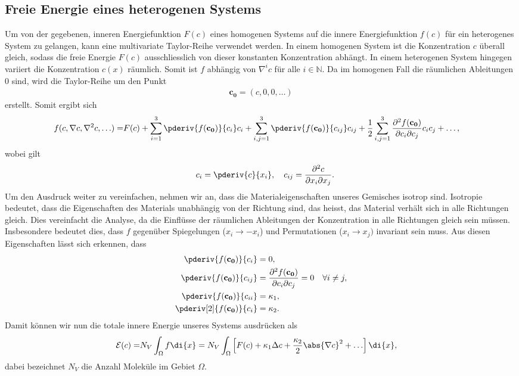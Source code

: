 \subsection{Freie Energie eines heterogenen Systems}
Um von der gegebenen, inneren Energiefunktion $F(c)$ eines homogenen Systems
auf die innere Energiefunktion $f(c)$ für ein heterogenes System zu gelangen,
kann eine multivariate Taylor-Reihe verwendet werden.
In einem homogenen System ist die Konzentration $c$ überall gleich,
sodass die freie Energie $F(c)$ ausschliesslich von dieser konstanten Konzentration abhängt.
In einem heterogenen System hingegen variiert die Konzentration $c(x)$ räumlich.
Somit ist $f$ abhängig von $\nabla^i c$ für alle $i \in \mathbb{N}$.
Da im homogenen Fall die räumlichen Ableitungen $0$ sind,
wird die Taylor-Reihe um den Punkt
\begin{align*}
\mathbf{c_0}
=
(c, 0, 0, \ldots)
\end{align*}
erstellt.
Somit ergibt sich
\begin{align*}
f(c, \nabla c, \nabla^2 c, \ldots)
=
& F(c)
+ \sum_{i=1}^3 \pderiv{f(\mathbf{c_0})}{c_i} c_i
+ \sum_{i,j=1}^3 \pderiv{f(\mathbf{c_0})}{c_{ij}} c_{ij}
+ \frac{1}{2} \sum_{i,j=1}^3 \frac{\partial^2 f(\mathbf{c_0})}{%
\partial c_i \partial c_j} c_{i} c_{j}
+ \ldots
,
\end{align*}
wobei gilt
\begin{align*}
\quad
c_i
=
\pderiv{c}{x_i}
,\quad
c_{ij}
=
\frac{\partial^2 c}{\partial x_i \partial x_j}
.
\end{align*}
Um den Ausdruck weiter zu vereinfachen,
nehmen wir an,
dass die Materialeigenschaften unseres Gemisches isotrop sind.
Isotropie bedeutet,
dass die Eigenschaften des Materials unabhängig von der Richtung sind,
das heisst,
das Material verhält sich in alle Richtungen gleich.
Dies vereinfacht die Analyse,
da die Einflüsse der räumlichen Ableitungen der Konzentration
in alle Richtungen gleich sein müssen.
Insbesondere bedeutet dies,
dass $f$ gegenüber Spiegelungen ($x_i \rightarrow -x_i$) und
Permutationen ($x_i \rightarrow x_j)$ invariant sein muss.
Aus diesen Eigenschaften lässt sich erkennen,
dass
\begin{align*}
\pderiv{f(\mathbf{c_0})}{c_i}
&=
0,
\\
\pderiv{f(\mathbf{c_0})}{c_{ij}}
&=
\frac{\partial^2 f(\mathbf{c_0})}{\partial c_i \partial c_j}
=
0
\quad \forall i \neq j,
\\
\pderiv{f(\mathbf{c_0})}{c_{ii}}
&=
\kappa_1,
\\
 \pderiv[2]{f(\mathbf{c_0})}{c_i}
&=
\kappa_2
.
\end{align*}
Damit können wir nun die totale innere Energie unseres Systems ausdrücken als
\begin{align}
\mathcal{E}(c)
=
&N_V \int_\Omega f\di{x}
=
N_V \int_\Omega \left[
F(c) + \kappa_1 \Delta c + \frac{\kappa_2}{2} \abs{\nabla c}^2  + \ldots
\right]\di{x}
\label{cahnhilliard:energylong}
,
\end{align}
dabei bezeichnet $N_V$ die Anzahl Moleküle im Gebiet $\Omega$.

